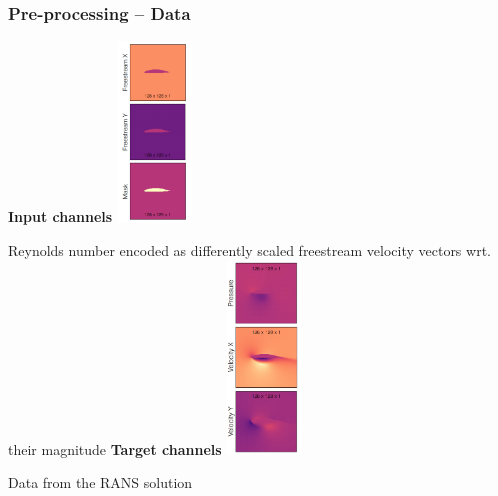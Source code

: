 \begin{frame}
    \frametitle{Pre-processing -- Data}
\vspace*{0.8cm}

\begin{multicols}{2}
    \textbf{Input channels}\newline
    \vspace*{0.6cm}
    \includegraphics[width=0.15\textwidth, height=.45\textheight]{./Ressourcen/Praesentation/Bilder/sampleInput.png}

  
   
\vspace*{-0.9cm}
Reynolds number encoded as differently scaled \newline freestream velocity vectors wrt. their magnitude
    \vfill\columnbreak
    \textbf{Target channels}\newline
    \vspace*{0.6cm}
    \includegraphics[width=0.15\textwidth, height=.45\textheight]{./Ressourcen/Praesentation/Bilder/sampleTarget.png}

  
   
\vspace*{-0.9cm}
Data from the RANS solution
\end{multicols}

\end{frame}
\clearpage


